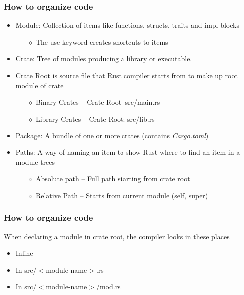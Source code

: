 \documentclass{beamer}
\begin{document}
\begin{frame}
    \frametitle{How to organize code}
    \begin{itemize}
        \item Module: Collection of items like functions, structs, traits and impl blocks
        \begin{itemize}
            \item[$\diamond$] The use keyword creates shortcuts to items
        \end{itemize}
        \vspace{\baselineskip}
        \item Crate: Tree of modules producing a library or executable.
        \item Crate Root is source file that Rust compiler starts from to make up root module of crate
        \begin{itemize}
            \item[$\diamond$] Binary Crates – Crate Root: src/main.rs
            \item[$\diamond$] Library Crates – Crate Root: src/lib.rs
        \end{itemize}
        \vspace{\baselineskip}
        \item Package: A bundle of one or more crates (contains \textit{Cargo.toml})
        \vspace{\baselineskip}
        \item Paths: A way of naming an item to show Rust where to find an item in a module trees
        \begin{itemize}
            \item[$\diamond$] Absolute path – Full path starting from crate root
            \item[$\diamond$] Relative Path – Starts from current module (self, super)
        \end{itemize}
    \end{itemize}
\end{frame}


\begin{frame}
    \frametitle{How to organize code}
    When declaring a module in crate root, the compiler looks in these places
    \begin{itemize}
        \item Inline
        \item In src/$<$module-name$>$.rs
        \item In src/$<$module-name$>$/mod.rs
     \end{itemize}
\end{frame}
\end{document}
